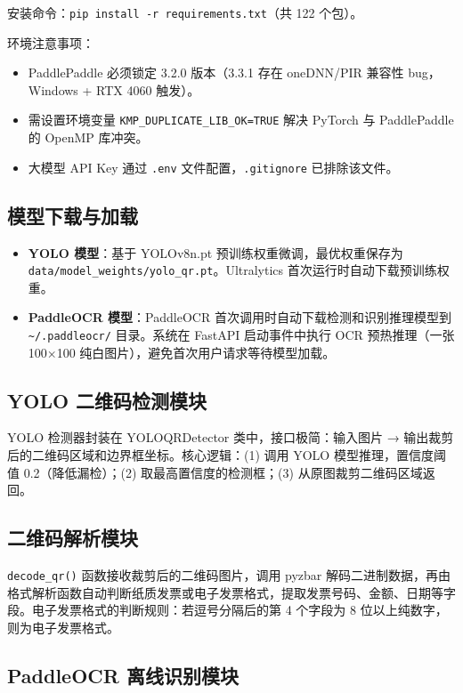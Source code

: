 \documentclass[12pt,a4paper]{ctexart}
\begin{document}
安装命令：\texttt{pip install -r requirements.txt}（共 122 个包）。

环境注意事项：
\begin{itemize}
  \item PaddlePaddle 必须锁定 3.2.0 版本（3.3.1 存在 oneDNN/PIR 兼容性 bug，Windows + RTX 4060 触发）。
  \item 需设置环境变量 \texttt{KMP\_DUPLICATE\_LIB\_OK=TRUE} 解决 PyTorch 与 PaddlePaddle 的 OpenMP 库冲突。
  \item 大模型 API Key 通过 \texttt{.env} 文件配置，\texttt{.gitignore} 已排除该文件。
\end{itemize}

\subsection{模型下载与加载}

\begin{itemize}
  \item \textbf{YOLO 模型}：基于 YOLOv8n.pt 预训练权重微调，最优权重保存为 \texttt{data/model\_weights/yolo\_qr.pt}。Ultralytics 首次运行时自动下载预训练权重。
  \item \textbf{PaddleOCR 模型}：PaddleOCR 首次调用时自动下载检测和识别推理模型到 \texttt{\textasciitilde/.paddleocr/} 目录。系统在 FastAPI 启动事件中执行 OCR 预热推理（一张 100×100 纯白图片），避免首次用户请求等待模型加载。
\end{itemize}

\subsection{YOLO 二维码检测模块}

YOLO 检测器封装在 YOLOQRDetector 类中，接口极简：输入图片 → 输出裁剪后的二维码区域和边界框坐标。核心逻辑：(1) 调用 YOLO 模型推理，置信度阈值 0.2（降低漏检）；(2) 取最高置信度的检测框；(3) 从原图裁剪二维码区域返回。

\subsection{二维码解析模块}

\texttt{decode\_qr()} 函数接收裁剪后的二维码图片，调用 pyzbar 解码二进制数据，再由格式解析函数自动判断纸质发票或电子发票格式，提取发票号码、金额、日期等字段。电子发票格式的判断规则：若逗号分隔后的第 4 个字段为 8 位以上纯数字，则为电子发票格式。

\subsection{PaddleOCR 离线识别模块}
\end{document}
